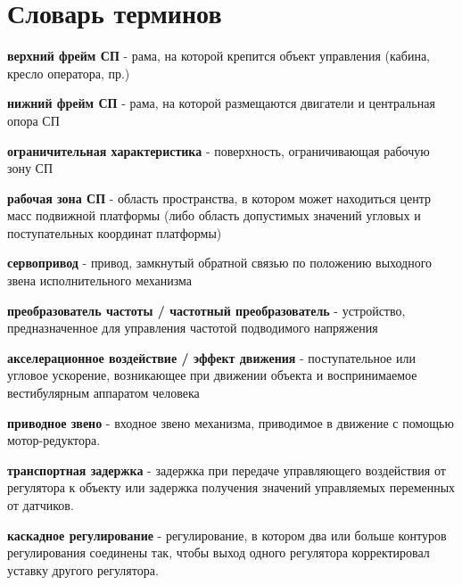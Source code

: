 \chapter*{Словарь терминов}             %

\textbf{верхний фрейм СП} - рама, на которой крепится объект управления (кабина, кресло оператора, пр.)

\textbf{нижний фрейм СП} - рама, на которой размещаются двигатели и центральная опора СП

\textbf{ограничительная характеристика} - поверхность, ограничивающая рабочую зону СП

\textbf{рабочая зона СП} - область пространства, в котором может находиться центр масс подвижной платформы (либо область допустимых значений угловых и поступательных координат платформы)

\textbf{сервопривод} - привод, замкнутый обратной связью по положению выходного звена исполнительного механизма

\textbf{преобразователь частоты / частотный преобразователь} - устройство, предназначенное для управления частотой подводимого напряжения

\textbf{акселерационное воздействие / эффект движения} - поступательное или угловое ускорение, возникающее при движении объекта и воспринимаемое вестибулярным аппаратом человека

\textbf{приводное звено} - входное звено механизма, приводимое в движение с помощью мотор-редуктора.

\textbf{транспортная задержка} - задержка при передаче управляющего воздействия от регулятора к объекту или задержка получения значений управляемых переменных от датчиков.

\textbf{каскадное регулирование} - регулирование, в котором два или больше контуров регулирования соединены так, чтобы выход одного регулятора корректировал уставку другого регулятора.
